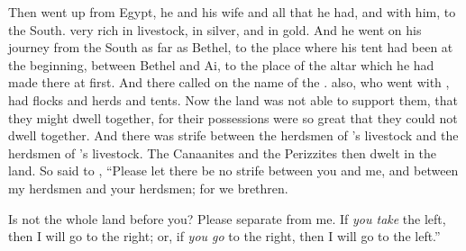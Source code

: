 
\bverse Then  went up from Egypt, he and his wife and all that he had, and  with him, to the South.
\bverse {} \was very rich in livestock, in silver, and in gold.
\bverse And he went on his journey from the South as far as Bethel, to the place where his tent had been at the beginning, between Bethel and Ai, 
\bverse to the place of the altar which he had made there at first. And there  called on the name of the \lord.
\bverse {} also, who went with , had flocks and herds and tents.
\bverse Now the land was not able to support them, that they might dwell together, for their possessions were so great that they could not dwell together.
\bverse And there was strife between the herdsmen of 's livestock and the herdsmen of 's livestock. The Canaanites and the Perizzites then dwelt in the land.
\bverse So  said to , ``Please let there be no strife between you and me, and between my herdsmen and your herdsmen; for we \are brethren.

\bverse Is not the whole land before you? Please separate from me. If \textit{you take} the left, then I will go to the right; or, if \textit{you go} to the right, then I will go to the left.''
	

